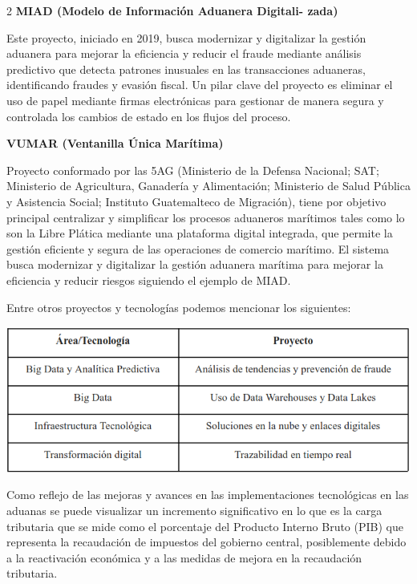 \documentclass[12pt,spanish,Letterpaper,openany]{book}
\begin{document}
\begin {multicols}{2}
\textbf{MIAD (Modelo de Información Aduanera Digitali-
zada)}

Este proyecto, iniciado en 2019, busca modernizar y digitalizar la gestión aduanera para mejorar la eficiencia y reducir el fraude mediante análisis predictivo que detecta patrones inusuales en las transacciones aduaneras, identificando fraudes y evasión fiscal. Un pilar clave del proyecto es eliminar el uso de papel mediante firmas electrónicas para gestionar de manera segura y controlada los cambios de estado en los flujos del proceso.

\textbf{VUMAR (Ventanilla Única Marítima)}

Proyecto conformado por las 5AG (Ministerio de la Defensa Nacional; SAT; Ministerio de Agricultura, Ganadería y Alimentación; Ministerio de Salud Pública y Asistencia Social; Instituto Guatemalteco de Migración), tiene por objetivo principal centralizar y simplificar los procesos aduaneros marítimos tales como lo son la Libre Plática mediante una plataforma digital integrada, que permite la gestión eficiente y segura de las operaciones de comercio
marítimo. El sistema busca modernizar y digitalizar la gestión aduanera marítima para mejorar la eficiencia y reducir riesgos siguiendo el ejemplo de MIAD.

Entre otros proyectos y tecnologías podemos mencionar los siguientes:

\begin {flushleft}
\noindent\begin{minipage}[c]{\columnwidth}

\includegraphics[width=1\linewidth]{imagenes_articulos/sp16_01}

\end{minipage}
\end {flushleft}

\bigskip
\bigskip
\bigskip
\bigskip

Como reflejo de las mejoras y avances en las implementaciones tecnológicas en las aduanas se puede visualizar un incremento significativo en lo que es la carga tributaria que se mide como el porcentaje del Producto Interno Bruto (PIB) que representa la recaudación de impuestos del gobierno central, posiblemente debido a la reactivación económica y a las medidas de mejora en la recaudación tributaria.


\end{multicols}
\end{document}
